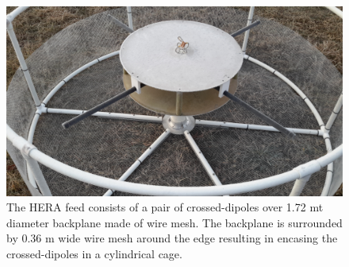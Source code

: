 \documentclass[twocolumn]{emulateapj}
\begin{document}
\begin{figure}
\centering
\includegraphics[trim={2cm 10cm 20cm 5cm},clip, totalheight=0.3\textheight]{plots/herafeed.jpg}
\vspace{1.0 em}
\caption{The HERA feed consists of a pair of crossed-dipoles over 1.72 mt diameter backplane made of wire mesh. The backplane is surrounded by 0.36 m wide wire mesh around the edge resulting in encasing the crossed-dipoles in a cylindrical cage.}
\label{fig:herafeed}
\end{figure}
\end{document}
